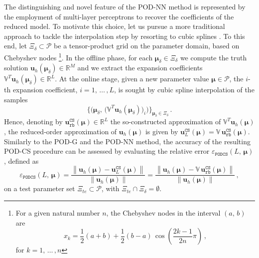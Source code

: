 \documentclass[12pt, a4paper, twoside, openright, notitlepage]{report}
\numberwithin{equation}{chapter}
\theoremstyle{theorem}
\theoremstyle{definition}
\theoremstyle{remark}
\theoremstyle{proposition}
\numberwithin{figure}{chapter}
\newcommand{\norm}[1]{\left\lVert#1\right\rVert}
\newcommand{\bg}[1]{\boldsymbol{#1}}
\begin{document}
		The distinguishing and novel feature of the POD-NN method is represented by the employment of multi-layer perceptrons to recover the coefficients of the reduced model. To motivate this choice, let us pursue a more traditional approach to tackle the interpolation step by resorting to cubic splines \cite{Deb78}. To this end, let $\Xi_{\delta} \subset \mathcal{P}$ be a tensor-product grid on the parameter domain, based on Chebyshev nodes \footnote{For a given natural number $n$, the Chebyshev nodes in the interval $(a, \, b)$ are \[ x_k = \dfrac{1}{2}(a + b) + \dfrac{1}{2}(b - a) \, \cos \left( \dfrac{2k - 1}{2n} \pi \right) \, , \] for $k = 1, \, \ldots \, , n$}. In the offline phase, for each $\bg{\mu}_{\delta} \in \Xi_{\delta}$ we compute the truth solution $\mathbf{u}_h(\bg{\mu}_{\delta}) \in \mathbb{R}^M$ and we extract the expansion coefficients $\mathbb{V}^T \mathbf{u}_h(\bg{\mu}_{\delta}) \in \mathbb{R}^L$. At the online stage, given a new parameter value $\bg{\mu} \in \mathcal{P}$, the $i$-th expansion coefficient, $i = 1, \, \ldots \, , L$, is sought by cubic spline interpolation of the samples \[ \big\lbrace \big( \bg{\mu}_{\delta}, \, \big( \mathbb{V}^T \mathbf{u}_h(\bg{\mu}_{\delta}) \big)_i \big) \big\rbrace_{\bg{\mu}_{\delta} \in \Xi_{\delta}} \, . \] Hence, denoting by $\mathbf{u}_{\texttt{rb}}^{\texttt{CS}}(\bg{\mu}) \in \mathbb{R}^L$ the so-constructed approximation of $\mathbb{V}^T \mathbf{u}_h(\bg{\mu})$, the reduced-order approximation of $\mathbf{u}_h(\bg{\mu})$ is given by $\mathbf{u}_L^{\texttt{CS}}(\bg{\mu}) = \mathbb{V} \, \mathbf{u}_{\texttt{rb}}^{\texttt{CS}}(\bg{\mu})$. Similarly to the POD-G and the POD-NN method, the accuracy of the resulting POD-CS procedure can be assessed by evaluating the relative error $\varepsilon_{\texttt{PODCS}}^{}(L, \, \bg{\mu})$, defined as
		\begin{equation*}
			\label{eq:podcs-error}
			\varepsilon_{\texttt{PODCS}}^{}(L, \, \bg{\mu}) = \dfrac{\norm{\mathbf{u}_h(\bg{\mu}) - \mathbf{u}_L^{\texttt{CS}}(\bg{\mu})}}{\norm{\mathbf{u}_h(\bg{\mu})}} = \dfrac{\norm{\mathbf{u}_h(\bg{\mu}) - \mathbb{V} \, \mathbf{u}_{\texttt{rb}}^{\texttt{CS}}(\bg{\mu})}}{\norm{\mathbf{u}_h(\bg{\mu})}} \, ,
		\end{equation*}
		on a test parameter set $\Xi_{te} \subset \mathcal{P}$, with $\Xi_{te} \cap \Xi_{\delta} = \emptyset$.
		
\end{document}
